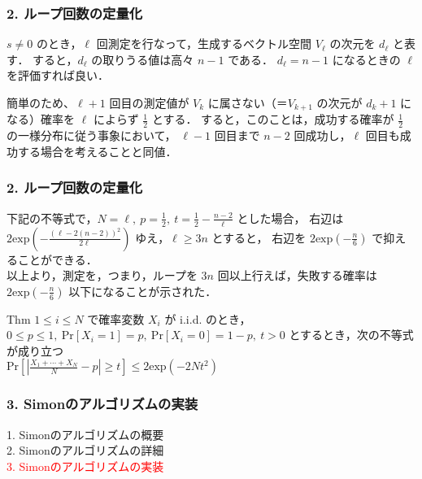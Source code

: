 \documentclass[dvipdfmx,12pt]{beamer}%
\begin{document}
\begin{frame}

\frametitle{2. ループ回数の定量化}
                          
$s \neq 0$ のとき，$\ell$ 回測定を行なって，生成するベクトル空間 $ V_{\ell} $ の次元を $d_{\ell}$ と表す．
すると，$d_{\ell}$ の取りうる値は高々 $n - 1$ である．
$ d_{\ell} = n - 1 $ になるときの $\ell$ を評価すれば良い．\\

\vspace{10pt}

簡単のため、$ \ell + 1 $ 回目の測定値が $ V_k $ に属さない（＝$ V_{k + 1} $ の次元が $d_k + 1$ になる）確率を
$\ell$ によらず $ \frac{1}{2} $ とする．
すると，このことは，成功する確率が $ \frac{1}{2} $ の一様分布に従う事象において，
$ \ell - 1 $ 回目まで $ n - 2 $ 回成功し，$ \ell $ 回目も成功する場合を考えることと同値．

\end{frame}


\begin{frame}

\frametitle{2. ループ回数の定量化}
                                  
下記の不等式で，$ N = \ell, \ p = \frac{1}{2}, \ t = \frac{1}{2} - \frac{n - 2}{\ell} $ とした場合，
右辺は $ \displaystyle 2 \mathrm{exp} \left( - \frac{(\ell - 2(n - 2))^2}{2 \ell} \right) $ ゆえ，$ \ell \geq 3n $ とすると，
右辺を $ \displaystyle 2 \mathrm{exp} \left(- \frac{n}{6} \right) $ で抑えることができる．\\
以上より，測定を，つまり，ループを $ 3n $ 回以上行えば，失敗する確率は $ \displaystyle 2 \mathrm{exp} (- \frac{n}{6} ) $ 
以下になることが示された．
    
\vspace{10pt}

\begin{itembox}[l]{Thm}
   $ 1 \leq i \leq N $ で確率変数 $X_i$ が i.i.d. のとき，
   $ 0 \leq p \leq 1, \ \mathrm{Pr}[X_i = 1] = p, \ \mathrm{Pr}[X_i = 0] = 1 - p, \ t > 0 $ とするとき，次の不等式が成り立つ \\
   $ \displaystyle \mathrm{Pr} \left[ \left| \frac{X_1 + \cdots + X_N}{N} - p \right| \geq t \right] \leq 2 \mathrm{exp}(-2 N t^2) $
\end{itembox} 
            
\end{frame}


\begin{frame}

\frametitle{3. Simonのアルゴリズムの実装}
          
1. Simonのアルゴリズムの概要 \\
2. Simonのアルゴリズムの詳細 \\
\textcolor{red}{3. Simonのアルゴリズムの実装}
              
\end{frame}
\end{document}
